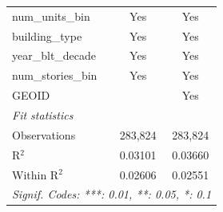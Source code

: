 \begin{tabular}{lcc}
   num\_units\_bin         & Yes             & Yes\\  
   building\_type          & Yes             & Yes\\  
   year\_blt\_decade       & Yes             & Yes\\  
   num\_stories\_bin       & Yes             & Yes\\  
   GEOID                   &                 & Yes\\  
   \midrule
   \emph{Fit statistics}\\
   Observations            & 283,824         & 283,824\\  
   R$^2$                   & 0.03101         & 0.03660\\  
   Within R$^2$            & 0.02606         & 0.02551\\  
   \midrule \midrule
   \multicolumn{3}{l}{\emph{Signif. Codes: ***: 0.01, **: 0.05, *: 0.1}}\\
\end{tabular}
\par\endgroup
